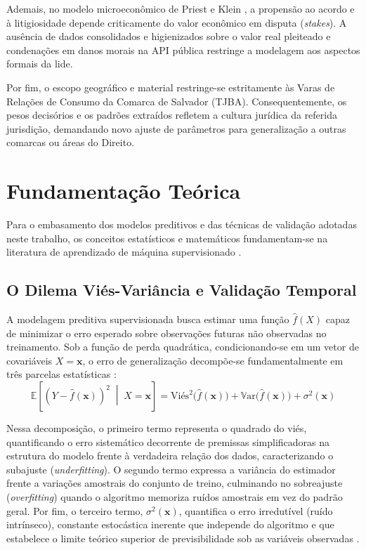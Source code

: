 \documentclass[conference]{IEEEtran}
\begin{document}
Ademais, no modelo microeconômico de Priest e Klein \cite{priest1984}, a propensão ao acordo e à litigiosidade depende criticamente do valor econômico em disputa (\textit{stakes}). A ausência de dados consolidados e higienizados sobre o valor real pleiteado e condenações em danos morais na API pública restringe a modelagem aos aspectos formais da lide.

Por fim, o escopo geográfico e material restringe-se estritamente às Varas de Relações de Consumo da Comarca de Salvador (TJBA). Consequentemente, os pesos decisórios e os padrões extraídos refletem a cultura jurídica da referida jurisdição, demandando novo ajuste de parâmetros para generalização a outras comarcas ou áreas do Direito.

\section{Fundamentação Teórica}
Para o embasamento dos modelos preditivos e das técnicas de validação adotadas neste trabalho, os conceitos estatísticos e matemáticos fundamentam-se na literatura de aprendizado de máquina supervisionado \cite{izbicki2020}.

\subsection{O Dilema Viés-Variância e Validação Temporal}
A modelagem preditiva supervisionada busca estimar uma função $\hat{f}(X)$ capaz de minimizar o erro esperado sobre observações futuras não observadas no treinamento. Sob a função de perda quadrática, condicionando-se em um vetor de covariáveis $X = \mathbf{x}$, o erro de generalização decompõe-se fundamentalmente em três parcelas estatísticas \cite{izbicki2020}:
\begin{equation}
\mathbb{E}\left[\left(Y - \hat{f}(\mathbf{x})\right)^2 \;\middle|\; X=\mathbf{x}\right] = \text{Viés}^2\big(\hat{f}(\mathbf{x})\big) + \mathbb{V}\text{ar}\big(\hat{f}(\mathbf{x})\big) + \sigma^2(\mathbf{x})
\label{eq:vies_variancia}
\end{equation}

Nessa decomposição, o primeiro termo representa o quadrado do viés, quantificando o erro sistemático decorrente de premissas simplificadoras na estrutura do modelo frente à verdadeira relação dos dados, caracterizando o subajuste (\textit{underfitting}). O segundo termo expressa a variância do estimador frente a variações amostrais do conjunto de treino, culminando no sobreajuste (\textit{overfitting}) quando o algoritmo memoriza ruídos amostrais em vez do padrão geral. Por fim, o terceiro termo, $\sigma^2(\mathbf{x})$, quantifica o erro irredutível (ruído intrínseco), constante estocástica inerente que independe do algoritmo e que estabelece o limite teórico superior de previsibilidade sob as variáveis observadas \cite{izbicki2020}.
\end{document}
